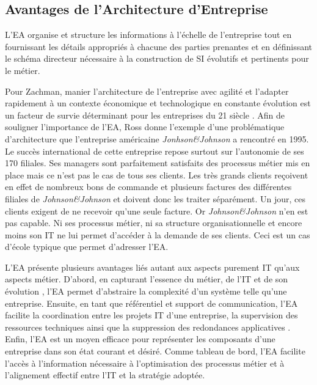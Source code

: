 
\subsection{Avantages de l'Architecture d'Entreprise}

L'EA organise et structure les informations à l'échelle de l'entreprise tout en
fournissant les détails appropriés à chacune des parties prenantes et en
définissant le schéma directeur nécessaire à la construction de SI évolutifs et
pertinents pour le métier. 


Pour Zachman, manier l'architecture de l'entreprise avec agilité et l'adapter
rapidement à un contexte économique et technologique en constante évolution est
un facteur de survie déterminant pour les entreprises du 21 siècle
\cite{zachman1997enterprise}. Afin de souligner l'importance de l'EA, Ross
\cite{rossyoutube} donne l'exemple d'une problématique d'architecture que
l'entreprise américaine \textit{Jonhson\&Johnson} a rencontré en 1995. Le
succès international de cette entreprise repose surtout sur l'autonomie de ses
170 filiales. Ses managers sont parfaitement satisfaits des processus métier
mis en place mais ce n'est pas le cas de tous ses clients. Les très grands
clients reçoivent en effet de nombreux bons de commande et plusieurs factures
des différentes filiales de \textit{Johnson\&Johnson} et doivent donc les
traiter séparément.  Un jour, ces clients exigent de ne recevoir qu'une seule
facture. Or \textit{Johnson\&Johnson} n'en est pas capable. Ni ses processus
métier, ni sa structure organisationnelle et encore moins son IT ne lui permet
d'accéder à la demande de ses clients. Ceci est un cas d'école typique que
permet d'adresser l'EA.

L'EA présente plusieurs avantages liés autant aux aspects purement IT qu'aux
aspects métier. D'abord, en capturant l'essence du métier, de l'IT et de son
évolution \cite{lankhorst2013enterprise}, l'EA permet d'abstraire la
complexité d'un système telle qu'une entreprise. Ensuite, en tant que
référentiel et support de communication, l'EA facilite la coordination entre les
projets IT d'une entreprise, la supervision des ressources techniques ainsi que
la suppression des redondances applicatives \cite{shah2007frameworks}. Enfin,
l'EA est un moyen efficace pour représenter les composants d'une entreprise
dans son état courant et désiré. Comme tableau de bord, l'EA facilite l'accès à
l'information nécessaire à l'optimisation des processus métier et à
l'alignement effectif entre l'IT et la stratégie adoptée. 

